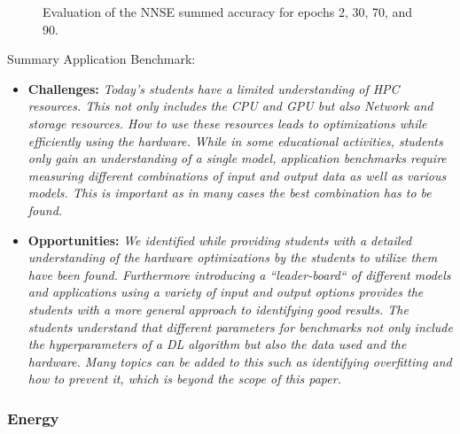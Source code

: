 \documentclass[utf8]{FrontiersinVancouver} %
\begin{document}
\begin{figure}[p]
\begin{center}
  \end{center}

  \caption {Evaluation of the NNSE summed accuracy for epochs 2, 30, 70, and 90.}
  \label{fig:NNSE-comparison-a100-summed}

\end{figure}




\begin{tcolorbox}
Summary Application Benchmark:

\begin{itemize}
\item {\bf Challenges:} {\it Today's students have a limited understanding of HPC resources. This not only includes the CPU and GPU but also Network and storage resources. How to use these resources leads to optimizations while efficiently using the hardware. While in some educational activities, students only gain an understanding of a single model, application benchmarks require measuring different combinations of input and output data as well as various models. This is important as in many cases the best combination has to be found. }
\item {\bf Opportunities:} {\it We identified while providing students with a detailed understanding of the hardware optimizations by the students to utilize them have been found. Furthermore introducing a ``leader-board`` of different models and applications using a variety of input and output options provides the students with a more general approach to identifying good results. The students understand that different parameters for benchmarks not only include the hyperparameters of a DL algorithm but also the data used and the hardware. Many topics can be added to this such as identifying overfitting and how to prevent it, which is beyond the scope of this paper.}
\end{itemize}
\end{tcolorbox}



\subsubsection{Energy}
\label{sec:perf-energy}
\end{document}

